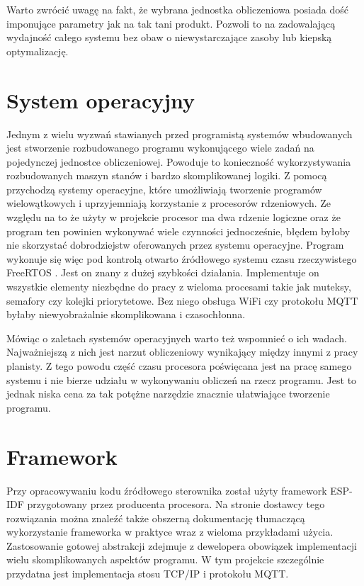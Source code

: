             Warto zwrócić uwagę na fakt, że wybrana jednostka obliczeniowa posiada dość imponujące parametry jak na tak tani produkt. Pozwoli to na zadowalającą wydajność
            całego systemu bez obaw o niewystarczające zasoby lub kiepską optymalizację.
    
    
        \section{System operacyjny}
            Jednym z wielu wyzwań stawianych przed programistą systemów wbudowanych jest stworzenie rozbudowanego programu wykonującego wiele zadań na pojedynczej jednostce obliczeniowej. Powoduje to konieczność wykorzystywania rozbudowanych maszyn stanów i bardzo skomplikowanej logiki. Z pomocą przychodzą systemy operacyjne, które umożliwiają tworzenie programów wielowątkowych i uprzyjemniają korzystanie z procesorów rdzeniowych. Ze względu na to że użyty w projekcie procesor ma dwa rdzenie logiczne oraz że program ten powinien wykonywać wiele czynności jednocześnie, błędem byłoby nie skorzystać dobrodziejstw oferowanych przez systemu operacyjne. Program wykonuje się więc pod kontrolą otwarto źródłowego systemu czasu rzeczywistego FreeRTOS \cite{freertos}. Jest on znany z dużej szybkości działania. Implementuje on wszystkie elementy niezbędne do pracy z wieloma procesami takie jak muteksy, semafory czy kolejki priorytetowe. Bez niego obsługa WiFi czy protokołu MQTT byłaby niewyobrażalnie skomplikowana i czasochłonna. 
            
            Mówiąc o zaletach systemów operacyjnych warto też wspomnieć o ich wadach. Najważniejszą z nich jest narzut obliczeniowy wynikający między innymi z pracy planisty. Z tego powodu część czasu procesora poświęcana jest na pracę samego systemu i nie bierze udziału w wykonywaniu obliczeń na rzecz programu. Jest to jednak niska cena za tak potężne narzędzie znacznie ułatwiające tworzenie programu.
      
            
        \section{Framework}
            Przy opracowywaniu kodu źródłowego sterownika został użyty framework ESP-IDF \cite{esp-idf} przygotowany przez producenta procesora. Na stronie dostawcy tego rozwiązania można znaleźć także obszerną dokumentację tłumaczącą wykorzystanie frameworka w praktyce wraz z wieloma przykładami użycia. Zastosowanie gotowej abstrakcji zdejmuje z dewelopera obowiązek implementacji wielu skomplikowanych aspektów programu. W tym projekcie szczególnie przydatna jest implementacja stosu TCP/IP i protokołu MQTT.
    
